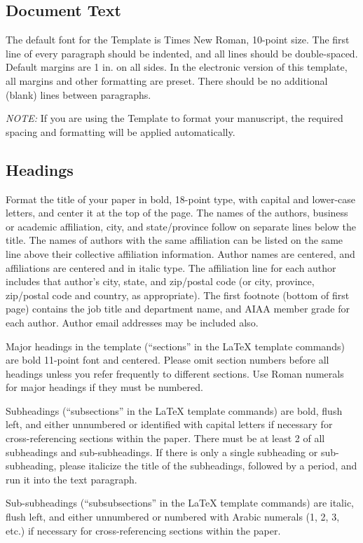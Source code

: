 \documentclass[journal]{new-aiaa}
\begin{document}
\subsection{Document Text}
The default font for the Template is Times New Roman, 10-point size. The first line of every paragraph should be indented, and all lines should be double-spaced. Default margins are 1 in. on all sides. In the electronic version of this template, all margins and other formatting are preset. There should be no additional (blank) lines between paragraphs.

\emph{NOTE:} If you are using the Template to format your manuscript, the required spacing and formatting will be applied automatically.


\subsection{Headings}
Format the title of your paper in bold, 18-point type, with capital and lower-case letters, and center it at the top of the page. The names of the authors, business or academic affiliation, city, and state/province follow on separate lines below the title. The names of authors with the same affiliation can be listed on the same line above their collective affiliation information. Author names are centered, and affiliations are centered and in italic type. The affiliation line for each author includes that author’s city, state, and zip/postal code (or city, province, zip/postal code and country, as appropriate). The first footnote (bottom of first page) contains the job title and department name, and AIAA member grade for each author. Author email addresses may be included also.

Major headings in the template (``sections'' in the \LaTeX{} template commands) are bold 11-point font and centered. Please omit section numbers before all headings unless you refer frequently to different sections. Use Roman numerals for major headings if they must be numbered.

Subheadings (``subsections'' in the \LaTeX{} template commands) are bold, flush left, and either unnumbered or identified with capital letters if necessary for cross-referencing sections within the paper. There must be at least 2 of all subheadings and sub-subheadings. If there is only a single subheading or sub-subheading, please italicize the title of the subheadings, followed by a period, and run it into the text paragraph. 

Sub-subheadings (``subsubsections'' in the \LaTeX{} template commands) are italic, flush left, and either unnumbered or numbered with Arabic numerals (1, 2, 3, etc.) if necessary for cross-referencing sections within the paper.
\end{document}
